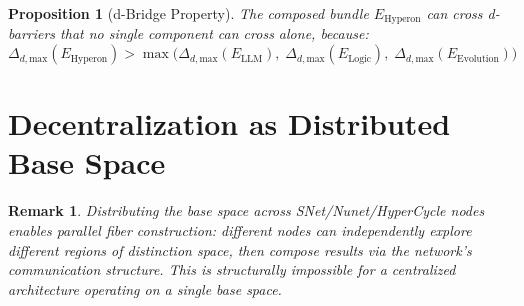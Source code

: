 \documentclass[11pt]{article}
\newtheorem{proposition}{Proposition}
\newtheorem{remark}{Remark}
\begin{document}
\begin{proposition}[d-Bridge Property]
The composed bundle $E_{\text{Hyperon}}$ can cross d-barriers that no
single component can cross alone, because:
\[
  \Delta_{d,\text{max}}(E_{\text{Hyperon}}) >
  \max\bigl(\Delta_{d,\text{max}}(E_{\text{LLM}}),\;
  \Delta_{d,\text{max}}(E_{\text{Logic}}),\;
  \Delta_{d,\text{max}}(E_{\text{Evolution}})\bigr)
\]
\end{proposition}

\section{Decentralization as Distributed Base Space}

\begin{remark}
Distributing the base space across SNet/Nunet/HyperCycle nodes enables
parallel fiber construction: different nodes can independently explore
different regions of distinction space, then compose results via the
network's communication structure. This is structurally impossible for
a centralized architecture operating on a single base space.
\end{remark}
\end{document}

